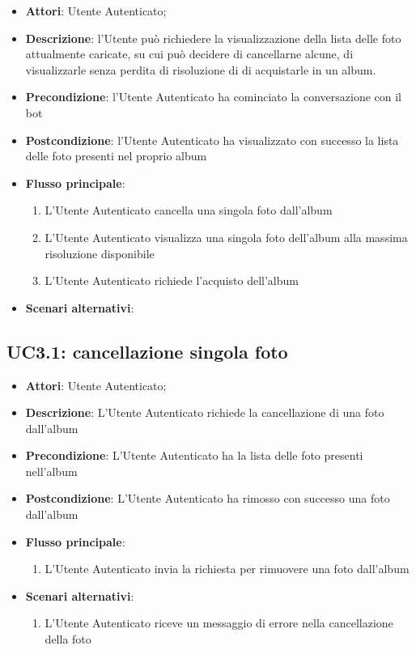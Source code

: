 \begin{itemize}
  \item \textbf{Attori}: Utente Autenticato;
  \item \textbf{Descrizione}: l'Utente può richiedere la visualizzazione della
lista delle foto attualmente caricate, su cui può decidere di cancellarne
alcune, di visualizzarle senza perdita di risoluzione di di acquistarle in un
album.
  \item \textbf{Precondizione}: l'Utente Autenticato ha cominciato la
conversazione con il bot
  \item \textbf{Postcondizione}: l'Utente Autenticato ha visualizzato con
successo la lista delle foto presenti nel proprio album
  \item \textbf{Flusso principale}:
  \begin{enumerate}
    \item L'Utente Autenticato cancella una singola foto dall'album
    \item L'Utente Autenticato visualizza una singola foto dell'album alla
massima risoluzione disponibile
    \item L'Utente Autenticato richiede l'acquisto dell'album
  \end{enumerate}
  \item \textbf{Scenari alternativi}: %
\end{itemize}



\subsection{UC3.1: cancellazione singola foto}
\label{uc:uc3.1}


\begin{itemize}
  \item \textbf{Attori}: Utente Autenticato;
  \item \textbf{Descrizione}: L'Utente Autenticato richiede la cancellazione di
una foto dall'album
  \item \textbf{Precondizione}: L'Utente Autenticato ha la lista delle foto
presenti nell'album
  \item \textbf{Postcondizione}: L'Utente Autenticato ha rimosso con successo
una foto dall'album
  \item \textbf{Flusso principale}:
  \begin{enumerate}
    \item L'Utente Autenticato invia la richiesta per rimuovere una foto
dall'album
  \end{enumerate}
  \item \textbf{Scenari alternativi}:
  \begin{enumerate}
    \item L'Utente Autenticato riceve un messaggio di errore nella
cancellazione della foto %
  \end{enumerate}
\end{itemize}


